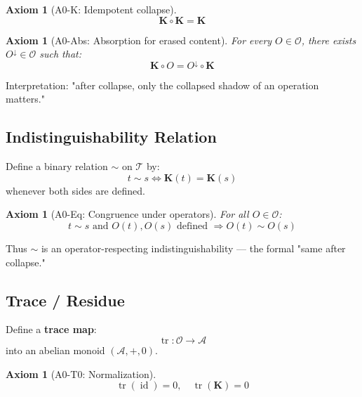 \documentclass[12pt, oneside]{article}
\newtheorem{axiom}[theorem]{Axiom}
\DeclareMathOperator{\id}{id}
\DeclareMathOperator{\tr}{tr}
\newcommand{\K}{\mathbf{K}}
\newcommand{\A}{\mathcal{A}}
\newcommand{\T}{\mathcal{T}}
\newcommand{\Opr}{\mathcal{O}}
\begin{document}
\begin{axiom}[A0-K: Idempotent collapse]
\begin{equation}
\K \circ \K = \K
\end{equation}
\end{axiom}

\begin{axiom}[A0-Abs: Absorption for erased content]
For every $O \in \Opr$, there exists $O^{\downarrow} \in \Opr$ such that:
\begin{equation}
\K \circ O = O^{\downarrow} \circ \K
\end{equation}
\end{axiom}

Interpretation: "after collapse, only the collapsed shadow of an operation matters."

\subsection{Indistinguishability Relation}

Define a binary relation $\sim$ on $\T$ by:
\begin{equation}
t \sim s \Longleftrightarrow \K(t) = \K(s)
\end{equation}
whenever both sides are defined.

\begin{axiom}[A0-Eq: Congruence under operators]
For all $O \in \Opr$:
\begin{equation}
t \sim s \text{ and } O(t), O(s) \text{ defined } \Rightarrow O(t) \sim O(s)
\end{equation}
\end{axiom}

Thus $\sim$ is an operator-respecting indistinguishability — the formal "same after collapse."

\subsection{Trace / Residue}

Define a \textbf{trace map}:
\begin{equation}
\tr: \Opr \rightarrow \A
\end{equation}
into an abelian monoid $(\A, +, 0)$.

\begin{axiom}[A0-T0: Normalization]
\begin{equation}
\tr(\id) = 0,\quad \tr(\K) = 0
\end{equation}
\end{axiom}
\end{document}
